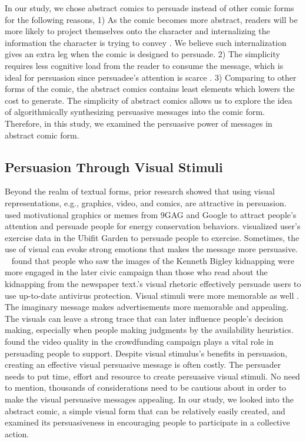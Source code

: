 In our study, we chose abstract comics to persuade instead of other comic forms for the following reasons, 1) As the comic becomes more abstract, readers will be more likely to project themselves onto the character and internalizing the information the character is trying to convey \textcite{scott1993understanding}. We believe such internalization gives an extra leg when the comic is designed to persuade. 2) The simplicity requires less cognitive load from the reader to consume the message, which is ideal for persuasion since persuadee's attention is scarce \cite{Janssen2016}. 3) Comparing to other forms of the comic, the abstract comics contains least elements which lowers the cost to generate. The simplicity of abstract comics allows us to explore the idea of algorithmically synthesizing persuasive messages into the comic form. Therefore, in this study, we examined the persuasive power of messages in abstract comic form.

\subsection{Persuasion Through Visual Stimuli}
Beyond the realm of textual forms, prior research showed that using visual representations, e.g., graphics, video, and comics, are attractive in persuasion. ~\textcite{selker2015sweetbuildinggreeter} used motivational graphics or memes from 9GAG and Google to attract people's attention and persuade people for energy conservation behaviors. \textcite{consolvo2008activity} visualized user's exercise data in the Ubifit Garden to persuade people to exercise. Sometimes, the use of visual can evoke strong emotions that makes the message more persuasive. ~\textcite{iyer2006picture} found that people who saw the images of the Kenneth Bigley kidnapping were more engaged in the later civic campaign than those who read about the kidnapping from the newspaper text.\textcite{zhang2014stop}'s visual rhetoric effectively persuade users to use up-to-date antivirus protection. Visual stimuli were more memorable as well \cite{nisbett1980human}. The imaginary message makes advertisements more memorable and appealing. The visuals can leave a strong trace that can later influence people's decision making, especially when people making judgments by the availability heuristics. ~\textcite{dey2017art} found the video quality in the crowdfunding campaign plays a vital role in persuading people to support. Despite visual stimulus's benefits in persuasion, creating an effective visual persuasive message is often costly. The persuader needs to put time, effort and resource to create persuasive visual stimuli. No need to mention, thousands of considerations need to be cautious about in order to make the visual persuasive messages appealing. In our study, we looked into the abstract comic, a simple visual form that can be relatively easily created, and examined its persuasiveness in encouraging people to participate in a collective action. 

